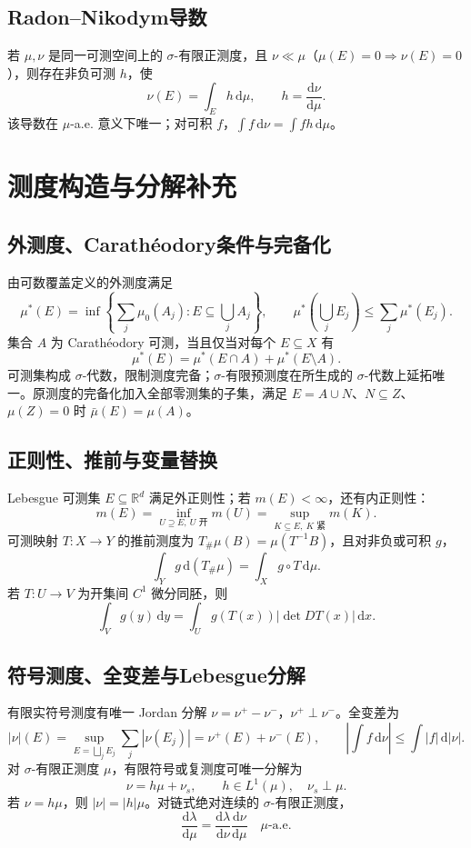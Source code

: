 \documentclass[../main.tex]{subfiles}
\begin{document}
\subsection{Radon--Nikodym导数}
若 $\mu,\nu$ 是同一可测空间上的 $\sigma$-有限正测度，且 $\nu\ll\mu$（$\mu(E)=0\Rightarrow\nu(E)=0$），则存在非负可测 $h$，使
\[
\nu(E)=\int_Eh\,\mathrm d\mu,\qquad h=\frac{\mathrm d\nu}{\mathrm d\mu}.
\]
该导数在 $\mu$-a.e. 意义下唯一；对可积 $f$，$\int f\,\mathrm d\nu=\int fh\,\mathrm d\mu$。
\section{测度构造与分解补充}
\subsection{外测度、Carathéodory条件与完备化}
由可数覆盖定义的外测度满足
\[
\mu^*(E)=\inf\left\{\sum_j\mu_0(A_j):E\subseteq\bigcup_jA_j\right\},\qquad
\mu^*\!\left(\bigcup_jE_j\right)\le\sum_j\mu^*(E_j).
\]
集合 $A$ 为 Carathéodory 可测，当且仅当对每个 $E\subseteq X$ 有
\[
\mu^*(E)=\mu^*(E\cap A)+\mu^*(E\setminus A).
\]
可测集构成 $\sigma$-代数，限制测度完备；$\sigma$-有限预测度在所生成的 $\sigma$-代数上延拓唯一。原测度的完备化加入全部零测集的子集，满足 $E=A\cup N$、$N\subseteq Z$、$\mu(Z)=0$ 时 $\bar\mu(E)=\mu(A)$。
\subsection{正则性、推前与变量替换}
Lebesgue 可测集 $E\subseteq\mathbb R^d$ 满足外正则性；若 $m(E)<\infty$，还有内正则性：
\[
m(E)=\inf_{U\supseteq E,\ U\text{ 开}}m(U)
=\sup_{K\subseteq E,\ K\text{ 紧}}m(K).
\]
可测映射 $T:X\to Y$ 的推前测度为 $T_\#\mu(B)=\mu(T^{-1}B)$，且对非负或可积 $g$，
\[
\int_Yg\,\mathrm d(T_\#\mu)=\int_Xg\circ T\,\mathrm d\mu.
\]
若 $T:U\to V$ 为开集间 $C^1$ 微分同胚，则
\[
\int_Vg(y)\,\mathrm dy=\int_Ug(T(x))|\det DT(x)|\,\mathrm dx.
\]
\subsection{符号测度、全变差与Lebesgue分解}
有限实符号测度有唯一 Jordan 分解 $\nu=\nu^+-\nu^-$，$\nu^+\perp\nu^-$。全变差为
\[
|\nu|(E)=\sup_{E=\bigsqcup_jE_j}\sum_j|\nu(E_j)|=\nu^+(E)+\nu^-(E),\qquad
\left|\int f\,\mathrm d\nu\right|\le\int|f|\,\mathrm d|\nu|.
\]
对 $\sigma$-有限正测度 $\mu$，有限符号或复测度可唯一分解为
\[
\nu=h\mu+\nu_s,\qquad h\in L^1(\mu),\quad \nu_s\perp\mu.
\]
若 $\nu=h\mu$，则 $|\nu|=|h|\mu$。对链式绝对连续的 $\sigma$-有限正测度，
\[
\frac{\mathrm d\lambda}{\mathrm d\mu}
=\frac{\mathrm d\lambda}{\mathrm d\nu}\frac{\mathrm d\nu}{\mathrm d\mu}\quad\mu\text{-a.e.}
\]
\end{document}
